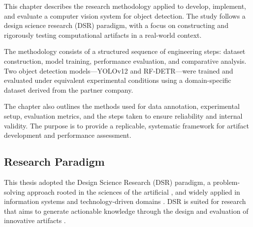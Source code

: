 \documentclass[a4paper,10pt,twocolumn]{article}
\numberwithin{figure}{section}
\numberwithin{table}{section}
\begin{document}

This chapter describes the research methodology applied to develop, 
implement, and evaluate a computer vision system for object detection. 
The study follows a design science research (DSR) paradigm, with a 
focus on constructing and rigorously testing computational 
artifacts in a real-world context.

The methodology consists of a structured sequence of engineering steps: 
dataset construction, model training, performance evaluation, and 
comparative analysis. Two object detection models—YOLOv12 and RF-DETR—were 
trained and evaluated under equivalent experimental conditions using a 
domain-specific dataset derived from the partner company.

The chapter also outlines the methods used for data annotation,
experimental setup, evaluation metrics, and the steps taken to 
ensure reliability and internal validity. The purpose is to provide
a replicable, systematic framework for artifact development and 
performance assessment.

\subsection{Research Paradigm}

This thesis adopted the Design Science Research (DSR) paradigm,
a problem-solving approach rooted in the sciences of the artificial \citep{simon1996sciences}, 
and widely applied in information systems and technology-driven domains \citep{vomBrocke2020introduction}. 
DSR is suited for research that aims to generate actionable 
knowledge through the design and evaluation of innovative artifacts \citep{hevner2004design}.
\end{document}
